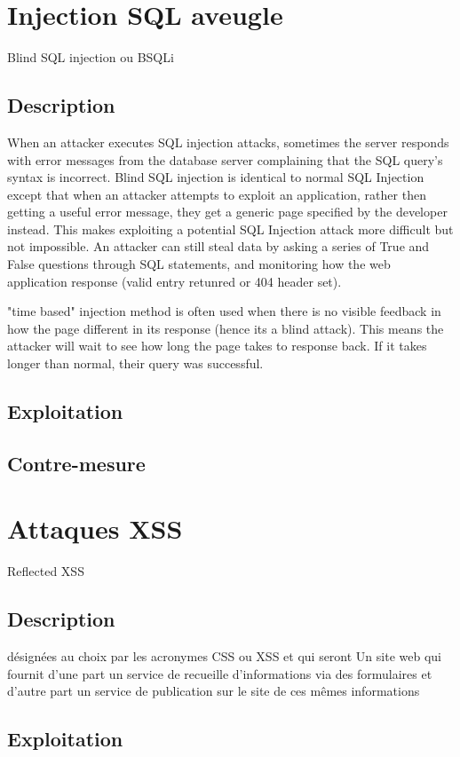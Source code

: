 \section{Injection SQL aveugle}
Blind SQL injection ou BSQLi
\subsection{Description}
When an attacker executes SQL injection attacks, sometimes the server responds with error messages from the database server complaining that the SQL query's syntax is incorrect. Blind SQL injection is identical to normal SQL Injection except that when an attacker attempts to exploit an application, rather then getting a useful error message, they get a generic page specified by the developer instead. This makes exploiting a potential SQL Injection attack more difficult but not impossible. An attacker can still steal data by asking a series of True and False questions through SQL statements, and monitoring how the web application response (valid entry retunred or 404 header set).

"time based" injection method is often used when there is no visible feedback in how the page different in its response (hence its a blind attack). This means the attacker will wait to see how long the page takes to response back. If it takes longer than normal, their query was successful.

\subsection{Exploitation}

\subsection{Contre-mesure}


\section{Attaques XSS }Reflected XSS

\subsection{Description}
 désignées au choix par les acronymes CSS ou XSS et qui seront
Un site web qui fournit d'une part un service de recueille d'informations via des formulaires et d'autre part un service de publication sur le site de ces mêmes informations
\subsection{Exploitation}

